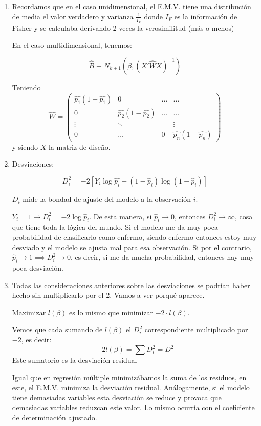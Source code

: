 \begin{enumerate}
  \item Recordamos que en el caso unidimensional, el E.M.V. tiene una distribución de media el valor verdadero y varianza $\frac{1}{I_F}$ donde $I_F$ es la información de Fisher y se calculaba derivando 2 veces la verosimilitud (más o menos)

  En el caso multidimensional, tenemos:

  \[
  \hat{B} \equiv N_{k+1}\left( β,(X'\hat{W}X)^{-1}\right)
  \]

  Teniendo \[\hat{W} = \begin{pmatrix}\hat{p_1}(1-\hat{p_1}) & 0 & \dots & \dots \\ 0 & \hat{p_2}(1-\hat{p_2}) & \dots & \dots \\ \vdots &\ddots & & \vdots \\ 0 & \dots & 0 & \hat{p_n}(1-\hat{p_n})
   \end{pmatrix}\]
  y siendo $X$ la matriz de diseño.
  \item Desviaciones:

    \[D_i^2 = -2\left[ Y_i\log \hat{p_i} + (1-\hat{p}_i)\log(1-\hat{p}_i)\right] \]

  $D_i$ mide la bondad de ajuste del modelo a la observación $i$. 

  \subitem $Y_i = 1 \to D_i^2 = -2\log \hat{p}_i$. De esta manera, si $\hat{p}_i \to 0$, entonces $D_i^2 \to ∞$, cosa que tiene toda la lógica del mundo. Si el modelo me da muy poca probabilidad de clasificarlo como enfermo, siendo enfermo entonces estoy muy desviado y el modelo se ajusta mal para esa observación. Si por el contrario, $\hat{p}_i \to 1 \implies D_i^2 \to 0$, es decir, si me da mucha probabilidad, entonces hay muy poca desviación.

  \item Todas las consideraciones anteriores sobre las desviaciones se podrían haber hecho sin multiplicarlo por el 2. Vamos a ver porqué aparece.

  Maximizar $l(β)$ es lo mismo que minimizar $-2·l(β)$. 

  \begin{defn}
    Vemos que cada sumando de $l(β)$ el $D_i^2$ correspondiente multiplicado por $-2$, es decir:
    \[
      -2 l(β) = \sum D_i^2 = D^2
    \]
    Este sumatorio es la desviación residual
  \end{defn}
  \obs Igual que en regresión múltiple minimizábamos la suma de los residuos, en este, el E.M.V. minimiza la desviación residual. Análogamente, si el modelo tiene demasiadas variables esta desviación se reduce y provoca que demasiadas variables reduzcan este valor. Lo mismo ocurría con el coeficiente de determinación ajustado.


\end{enumerate}
